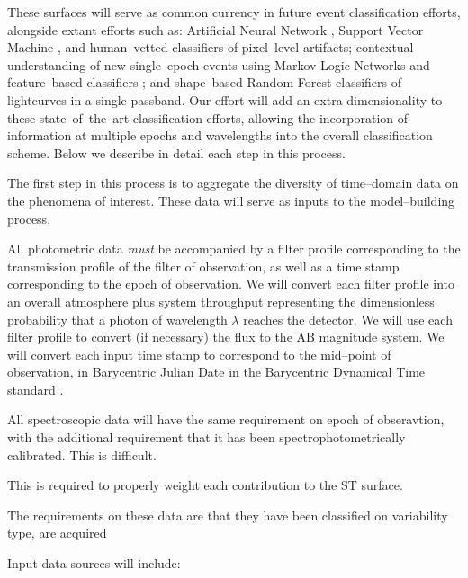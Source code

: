 These surfaces will serve as common currency in future event classification
efforts, alongside extant efforts such as: Artificial Neural Network
\citep{2008AN....329..263D}, Support Vector Machine \citep{2007ApJ...665.1246B},
and human--vetted \citep{2011arXiv1106.5491B} classifiers of pixel--level
artifacts; contextual understanding of new single--epoch events using Markov
Logic Networks \citep{2011arXiv1110.4655D} and feature--based classifiers
\citep{2011arXiv1106.5491B}; and shape--based Random Forest
\citep{2011ApJ...733...10R} classifiers of lightcurves in a single passband. Our
effort will add an extra dimensionality to these state--of--the--art
classification efforts, allowing the incorporation of information at multiple
epochs and wavelengths into the overall classification scheme.  Below we
describe in detail each step in this process.


 \smallskip

The first step in this process is to aggregate the diversity of time--domain
data on the phenomena of interest.  These data will serve as inputs to the
model--building process.

All photometric data {\it must} be accompanied by a filter profile corresponding
to the transmission profile of the filter of observation, as well as a time
stamp corresponding to the epoch of observation.  We will convert each filter
profile into an overall atmosphere plus system throughput representing the
dimensionless probability that a photon of wavelength $\lambda$ reaches the
detector.  We will use each filter profile to convert (if necessary) the flux to
the AB magnitude system.  We will convert each input time stamp to correspond to
the mid--point of observation, in Barycentric Julian Date in the Barycentric
Dynamical Time standard \citep{2010PASP..122..935E}.

All spectroscopic data will have the same requirement on epoch of obseravtion,
with the additional requirement that it has been spectrophotometrically
calibrated.  This is difficult.


This is required to properly weight each contribution to the ST surface.

The requirements on these data are that they have been classified on variability
type, are acquired

Input data sources will include:


